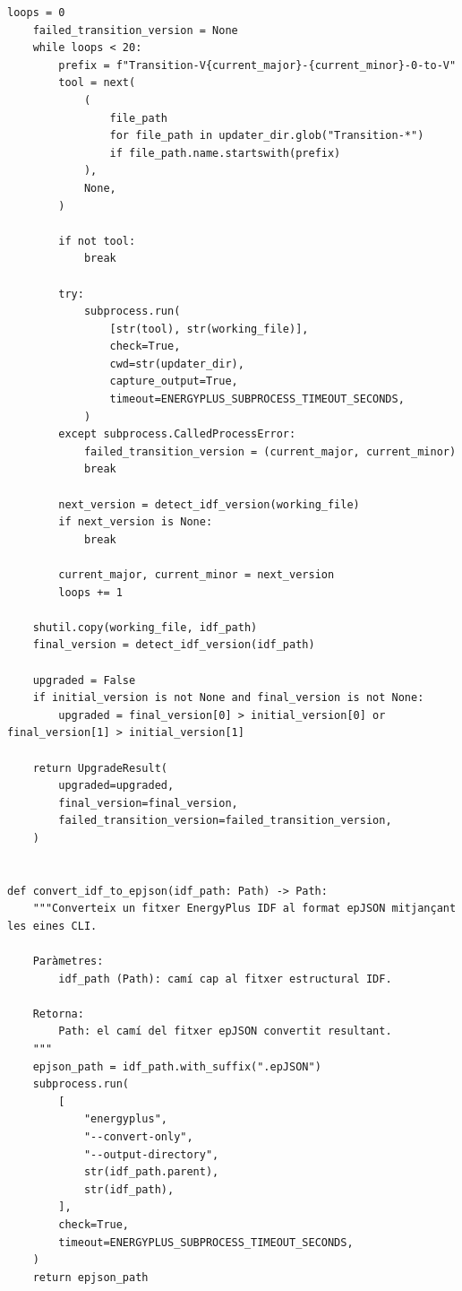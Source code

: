 \documentclass[10pt,a4paper]{article}
\begin{document}
\begin{lstlisting}[style=studioPython,caption={backend/afegir\_entorn\_conversion.py},label={lst:backend-afegir-entorn-conversion-py}]
    loops = 0
    failed_transition_version = None
    while loops < 20:
        prefix = f"Transition-V{current_major}-{current_minor}-0-to-V"
        tool = next(
            (
                file_path
                for file_path in updater_dir.glob("Transition-*")
                if file_path.name.startswith(prefix)
            ),
            None,
        )

        if not tool:
            break

        try:
            subprocess.run(
                [str(tool), str(working_file)],
                check=True,
                cwd=str(updater_dir),
                capture_output=True,
                timeout=ENERGYPLUS_SUBPROCESS_TIMEOUT_SECONDS,
            )
        except subprocess.CalledProcessError:
            failed_transition_version = (current_major, current_minor)
            break

        next_version = detect_idf_version(working_file)
        if next_version is None:
            break

        current_major, current_minor = next_version
        loops += 1

    shutil.copy(working_file, idf_path)
    final_version = detect_idf_version(idf_path)

    upgraded = False
    if initial_version is not None and final_version is not None:
        upgraded = final_version[0] > initial_version[0] or final_version[1] > initial_version[1]

    return UpgradeResult(
        upgraded=upgraded,
        final_version=final_version,
        failed_transition_version=failed_transition_version,
    )


def convert_idf_to_epjson(idf_path: Path) -> Path:
    """Converteix un fitxer EnergyPlus IDF al format epJSON mitjançant les eines CLI.

    Paràmetres:
        idf_path (Path): camí cap al fitxer estructural IDF.

    Retorna:
        Path: el camí del fitxer epJSON convertit resultant.
    """
    epjson_path = idf_path.with_suffix(".epJSON")
    subprocess.run(
        [
            "energyplus",
            "--convert-only",
            "--output-directory",
            str(idf_path.parent),
            str(idf_path),
        ],
        check=True,
        timeout=ENERGYPLUS_SUBPROCESS_TIMEOUT_SECONDS,
    )
    return epjson_path
\end{lstlisting}

\end{document}
